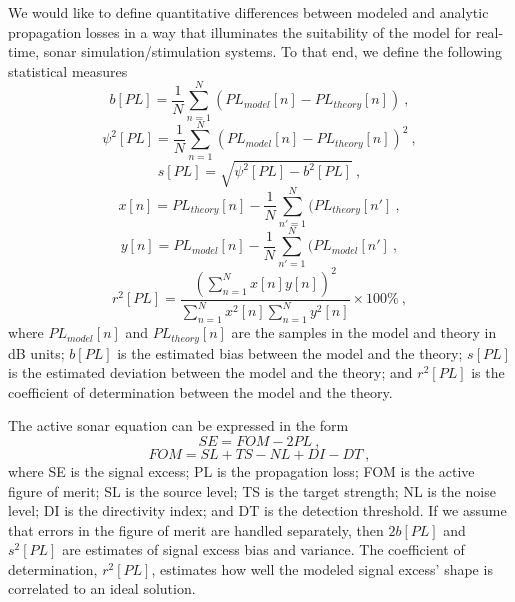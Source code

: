 \documentclass{ws-jca}
\begin{document}
We would like to define quantitative differences between modeled and analytic propagation losses in a way that illuminates the suitability of the model for real-time, sonar simulation/stimulation systems.  To that end, we define the following statistical measures
\begin{equation}
	b[PL] = \frac{1}{N} \sum^N_{n=1} ( PL_{model}[n] - PL_{theory}[n] ) \:,
	\label{eq:bias_calc}
\end{equation}
\begin{equation}
	\psi^2[PL] = \frac{1}{N} \sum^N_{n=1} 
		( PL_{model}[n] - PL_{theory}[n] )^2 \:,
\end{equation}
\begin{equation}
	s[PL] = \sqrt{ \psi^2[PL] - b^2[PL] } \:,
	\label{eq:dev_calc}
\end{equation}
\begin{equation}
	x[n] = PL_{theory}[n] - \frac{1}{N} \sum^N_{n'=1} ( PL_{theory}[n'] \:,
\end{equation}
\begin{equation}
	y[n] = PL_{model}[n] - \frac{1}{N} \sum^N_{n'=1} ( PL_{model}[n'] \:,
\end{equation}
\begin{equation}
	r^2[PL] =  \frac{ \left( \sum\limits^N_{n=1} x[n] y[n] \right)^2 }
	                   { \sum\limits^N_{n=1} x^2[n] \sum\limits^N_{n=1} y^2[n] } 
	                   \times 100\% \:,
	\label{eq:r2_calc}
\end{equation}
where
\(PL_{model}[n]\) and \(PL_{theory}[n]\) are the samples in the model and theory in dB units;
$b[PL]$ is the estimated bias between the model and the theory;
$s[PL]$ is the estimated deviation between the model and the theory; and
\(r^2[PL]\) is the coefficient of determination between the model and the theory.

The active sonar equation can be expressed in the form
\begin{equation}
	SE = FOM - 2 PL \:,
\end{equation}
\begin{equation}
	FOM = SL + TS - NL + DI - DT \:,
\end{equation}
where
SE is the signal excess;
PL is the propagation loss;
FOM is the active figure of merit;
SL is the source level;
TS is the target strength;
NL is the noise level;
DI is the directivity index; and
DT is the detection threshold.\cite{Urick1983}
If we assume that errors in the figure of merit are handled separately,
then \(2 b[PL]\) and \(s^2[PL]\) are estimates of signal excess bias and
variance. The coefficient of determination, \(r^2[PL]\), estimates how well
the modeled signal excess' shape is correlated to an ideal solution.
\end{document}
